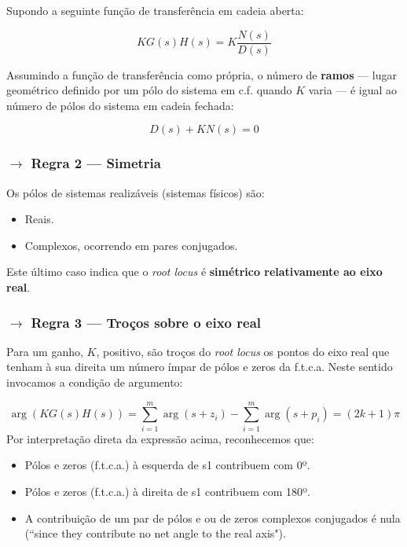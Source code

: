 \noindent Supondo a seguinte função de transferência em cadeia aberta:

$$
    KG(s)H(s) = K\dfrac{N(s)}{D(s)}
$$

\noindent Assumindo a função de transferência como própria, o número de \textbf{ramos} --- lugar geométrico definido por um pólo do sistema em c.f. quando $K$ varia --- é igual ao número de pólos do sistema em cadeia fechada:

$$
    \boxed{D(s) + KN(s) = 0}
$$
\subsubsection[3.3.2 Regra 2 --- Simetria]{$\pmb{\rightarrow}$ Regra 2 --- Simetria}

\noindent Os pólos de sistemas realizáveis (sistemas físicos) são:

\begin{itemize}
    \item Reais.
    \item Complexos, ocorrendo em pares conjugados.
\end{itemize}

\noindent Este último caso indica que o \textit{root locus} é \textbf{simétrico relativamente ao eixo real}.

\subsubsection[3.3.3 Regra 3 --- Troços sobre o eixo real]{$\pmb{\rightarrow}$ Regra 3 --- Troços sobre o eixo real}

\noindent Para um ganho, $K$, positivo, são troços do \textit{root locus} os pontos do eixo real que tenham à sua direita um número ímpar de pólos e zeros da f.t.c.a. Neste sentido invocamos a condição de argumento:

$$
    \arg(KG(s)H(s)) = \sum_{i = 1}^{m}\arg(s + z_i) - \sum_{i = 1}^{m}\arg(s + p_i) = (2k + 1)\pi
$$
\noindent Por interpretação direta da expressão acima, reconhecemos que:
\begin{itemize}
    \item Pólos e zeros (f.t.c.a.) à esquerda de s1 contribuem com 0º.
    \item Pólos e zeros (f.t.c.a.) à direita de s1 contribuem com 180º.
    \item A contribuição de um par de pólos e ou de zeros complexos conjugados é nula (``since they contribute no net angle to the real axis").
\end{itemize}

